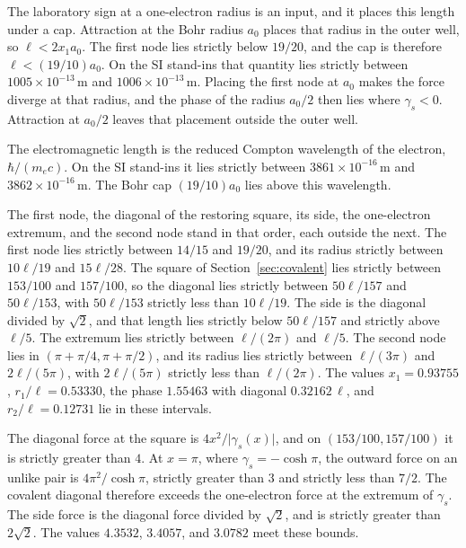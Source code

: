\documentclass[a4paper]{article}
\begin{document}
The laboratory sign at a one-electron radius is an input, and it places this length under a cap. Attraction at the Bohr radius \(a_0\) places that radius in the outer well, so \(\ell<2x_1 a_0\). The first node lies strictly below \(19/20\), and the cap is therefore \(\ell<(19/10)a_0\). On the SI stand-ins that quantity lies strictly between \(1005\times 10^{-13}\,\mathrm{m}\) and \(1006\times 10^{-13}\,\mathrm{m}\). Placing the first node at \(a_0\) makes the force diverge at that radius, and the phase of the radius \(a_0/2\) then lies where \(\gamma_s<0\). Attraction at \(a_0/2\) leaves that placement outside the outer well.

The electromagnetic length is the reduced Compton wavelength of the electron, \(\hbar/(m_e c)\). On the SI stand-ins it lies strictly between \(3861\times 10^{-16}\,\mathrm{m}\) and \(3862\times 10^{-16}\,\mathrm{m}\). The Bohr cap \((19/10)a_0\) lies above this wavelength.

The first node, the diagonal of the restoring square, its side, the one-electron extremum, and the second node stand in that order, each outside the next. The first node lies strictly between \(14/15\) and \(19/20\), and its radius strictly between \(10\ell/19\) and \(15\ell/28\). The square of Section~\ref{sec:covalent} lies strictly between \(153/100\) and \(157/100\), so the diagonal lies strictly between \(50\ell/157\) and \(50\ell/153\), with \(50\ell/153\) strictly less than \(10\ell/19\). The side is the diagonal divided by \(\sqrt{2}\), and that length lies strictly below \(50\ell/157\) and strictly above \(\ell/5\). The extremum lies strictly between \(\ell/(2\pi)\) and \(\ell/5\). The second node lies in \((\pi+\pi/4,\pi+\pi/2)\), and its radius lies strictly between \(\ell/(3\pi)\) and \(2\ell/(5\pi)\), with \(2\ell/(5\pi)\) strictly less than \(\ell/(2\pi)\). The values \(x_1=0.93755\), \(r_1/\ell=0.53330\), the phase \(1.55463\) with diagonal \(0.32162\,\ell\), and \(r_2/\ell=0.12731\) lie in these intervals.

The diagonal force at the square is \(4x^{2}/\bigl|\gamma_s(x)\bigr|\), and on \((153/100,157/100)\) it is strictly greater than \(4\). At \(x=\pi\), where \(\gamma_s=-\cosh\pi\), the outward force on an unlike pair is \(4\pi^{2}/\cosh\pi\), strictly greater than \(3\) and strictly less than \(7/2\). The covalent diagonal therefore exceeds the one-electron force at the extremum of \(\gamma_s\). The side force is the diagonal force divided by \(\sqrt{2}\), and is strictly greater than \(2\sqrt{2}\). The values \(4.3532\), \(3.4057\), and \(3.0782\) meet these bounds.
\end{document}
